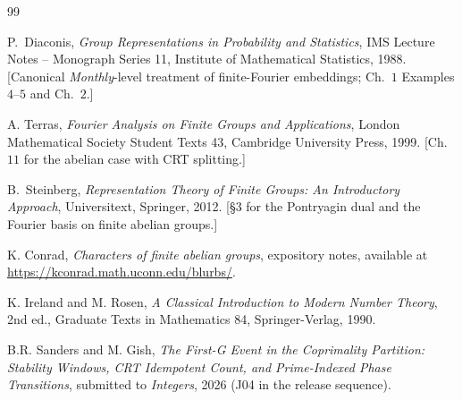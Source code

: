 \documentclass[11pt,reqno]{amsart}
\theoremstyle{definition}
\begin{document}
\begin{thebibliography}{99}

P.~Diaconis, \emph{Group Representations in Probability and
Statistics}, IMS Lecture Notes -- Monograph Series 11, Institute
of Mathematical Statistics, 1988. [Canonical
\emph{Monthly}-level treatment of finite-Fourier embeddings;
Ch.~$1$ Examples $4$--$5$ and Ch.~$2$.]

A. Terras, \emph{Fourier Analysis on Finite Groups and
Applications}, London Mathematical Society Student Texts 43,
Cambridge University Press, 1999. [Ch.~$11$ for the abelian case
with CRT splitting.]

B.~Steinberg, \emph{Representation Theory of Finite Groups: An
Introductory Approach}, Universitext, Springer, 2012. [\S$3$ for
the Pontryagin dual and the Fourier basis on finite abelian
groups.]

K. Conrad, \emph{Characters of finite abelian groups}, expository
notes, available at \url{https://kconrad.math.uconn.edu/blurbs/}.

K. Ireland and M. Rosen, \emph{A Classical Introduction to Modern
Number Theory}, 2nd ed., Graduate Texts in Mathematics 84,
Springer-Verlag, 1990.

B.R. Sanders and M. Gish, \emph{The First-G Event in the
Coprimality Partition: Stability Windows, CRT Idempotent Count,
and Prime-Indexed Phase Transitions}, submitted to
\emph{Integers}, 2026 (J04 in the release sequence).

\end{thebibliography}
\end{document}
